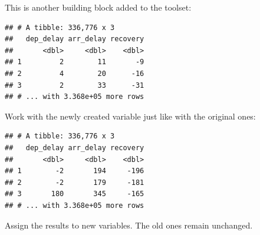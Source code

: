 \documentclass[]{book}
\newenvironment{Shaded}{}{}
\newcommand{\DataTypeTok}[1]{#1}
\newcommand{\KeywordTok}[1]{\textcolor[rgb]{0.00,0.00,1.00}{#1}}
\newcommand{\NormalTok}[1]{#1}
\newcommand{\OperatorTok}[1]{#1}
\newcommand{\StringTok}[1]{\textcolor[rgb]{0.00,0.50,0.50}{#1}}
\begin{document}
This is another building block added to the toolset:

\begin{Shaded}
\end{Shaded}

\begin{verbatim}
## # A tibble: 336,776 x 3
##   dep_delay arr_delay recovery
##       <dbl>     <dbl>    <dbl>
## 1         2        11       -9
## 2         4        20      -16
## 3         2        33      -31
## # ... with 3.368e+05 more rows
\end{verbatim}

Work with the newly created variable just like with the original ones:

\begin{Shaded}
\end{Shaded}

\begin{verbatim}
## # A tibble: 336,776 x 3
##   dep_delay arr_delay recovery
##       <dbl>     <dbl>    <dbl>
## 1        -2       194     -196
## 2        -2       179     -181
## 3       180       345     -165
## # ... with 3.368e+05 more rows
\end{verbatim}

Assign the results to new variables.
The old ones remain unchanged.

\begin{Shaded}
\end{Shaded}
\end{document}
